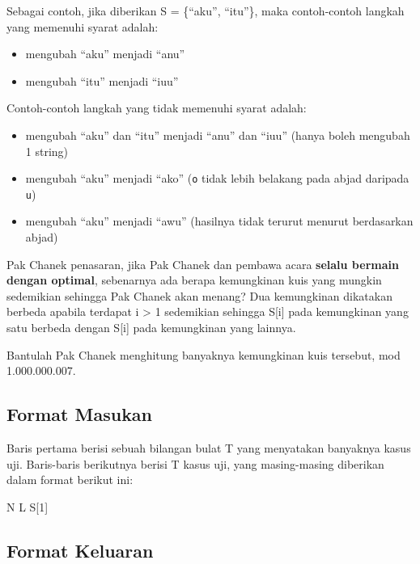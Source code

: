 \documentclass[../main_problemset.tex]{subfiles} %
\begin{document}
Sebagai contoh, jika diberikan S = \{``aku'', ``itu''\}, maka contoh-contoh langkah yang memenuhi syarat adalah:

\begin{itemize}
	\item mengubah ``aku'' menjadi ``anu''
	\item mengubah ``itu'' menjadi ``iuu''
\end{itemize}

Contoh-contoh langkah yang tidak memenuhi syarat adalah:

\begin{itemize}
	\item mengubah ``aku'' dan ``itu'' menjadi ``anu'' dan ``iuu'' (hanya boleh mengubah 1 string)
	\item mengubah ``aku'' menjadi ``ako'' (\texttt{o} tidak lebih belakang pada abjad daripada \texttt{u})
	\item mengubah ``aku'' menjadi ``awu'' (hasilnya tidak terurut menurut berdasarkan abjad)
\end{itemize}

Pak Chanek penasaran, jika Pak Chanek dan pembawa acara \textbf{selalu bermain dengan optimal}, sebenarnya ada berapa kemungkinan kuis yang mungkin sedemikian sehingga Pak Chanek akan menang? Dua kemungkinan dikatakan berbeda apabila terdapat i > 1 sedemikian sehingga S[i] pada kemungkinan yang satu berbeda dengan S[i] pada kemungkinan yang lainnya.

Bantulah Pak Chanek menghitung banyaknya kemungkinan kuis tersebut, mod 1.000.000.007.

\subsection*{Format Masukan}

Baris pertama berisi sebuah bilangan bulat T yang menyatakan banyaknya kasus uji. Baris-baris berikutnya berisi T kasus uji, yang masing-masing diberikan dalam format berikut ini:

\begin{lcverbatim}
N L
S[1]
\end{lcverbatim}

\subsection*{Format Keluaran}
\end{document}
